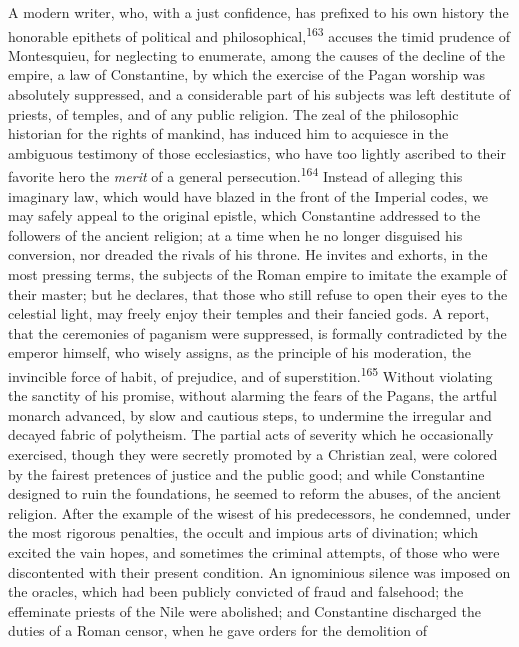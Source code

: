 A modern writer, who, with a just confidence, has prefixed to his
own history the honorable epithets of political and
philosophical,\textsuperscript{163} accuses the timid prudence of Montesquieu, for
neglecting to enumerate, among the causes of the decline of the
empire, a law of Constantine, by which the exercise of the Pagan
worship was absolutely suppressed, and a considerable part of his
subjects was left destitute of priests, of temples, and of any
public religion. The zeal of the philosophic historian for the
rights of mankind, has induced him to acquiesce in the ambiguous
testimony of those ecclesiastics, who have too lightly ascribed
to their favorite hero the \textit{merit} of a general persecution.\textsuperscript{164}
Instead of alleging this imaginary law, which would have blazed
in the front of the Imperial codes, we may safely appeal to the
original epistle, which Constantine addressed to the followers of
the ancient religion; at a time when he no longer disguised his
conversion, nor dreaded the rivals of his throne. He invites and
exhorts, in the most pressing terms, the subjects of the Roman
empire to imitate the example of their master; but he declares,
that those who still refuse to open their eyes to the celestial
light, may freely enjoy their temples and their fancied gods. A
report, that the ceremonies of paganism were suppressed, is
formally contradicted by the emperor himself, who wisely assigns,
as the principle of his moderation, the invincible force of
habit, of prejudice, and of superstition.\textsuperscript{165} Without violating
the sanctity of his promise, without alarming the fears of the
Pagans, the artful monarch advanced, by slow and cautious steps,
to undermine the irregular and decayed fabric of polytheism. The
partial acts of severity which he occasionally exercised, though
they were secretly promoted by a Christian zeal, were colored by
the fairest pretences of justice and the public good; and while
Constantine designed to ruin the foundations, he seemed to reform
the abuses, of the ancient religion. After the example of the
wisest of his predecessors, he condemned, under the most rigorous
penalties, the occult and impious arts of divination; which
excited the vain hopes, and sometimes the criminal attempts, of
those who were discontented with their present condition. An
ignominious silence was imposed on the oracles, which had been
publicly convicted of fraud and falsehood; the effeminate priests
of the Nile were abolished; and Constantine discharged the duties
of a Roman censor, when he gave orders for the demolition of
